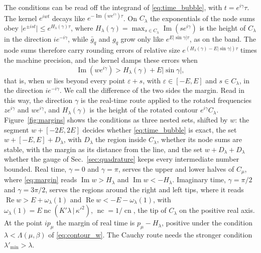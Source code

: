 \documentclass[aps,prb,reprint,a4paper]{revtex4-2}
\newcommand{\cn}{\operatorname{cn}}
\DeclareMathOperator{\Imag}{Im}
\DeclareMathOperator{\Real}{Re}
\begin{document}
The conditions can be read off the integrand of \eqref{eq:time_bubble}, with $t=e^{i\gamma}\tau$. The kernel $e^{iwt}$ decays like $e^{-\Imag(we^{i\gamma})\tau}$. On $C_\lambda$ the exponentials of the node sums obey $\lvert e^{\pm ist}\rvert\le e^{H_\lambda(\gamma)\tau}$, where $H_\lambda(\gamma)=\max_{s\in C_\lambda}\Imag(se^{i\gamma})$ is the height of $C_\lambda$ in the direction $ie^{-i\gamma}$, while $\bar g_q$ and $g_q$ grow only like $e^{E\lvert\sin\gamma\rvert\tau}$, as on the band. The node sums therefore carry rounding errors of relative size $e^{(H_\lambda(\gamma)-E\lvert\sin\gamma\rvert)\tau}$ times the machine precision, and the kernel damps these errors when
\begin{equation}
  \Imag(we^{i\gamma})>H_\lambda(\gamma)+E\lvert\sin\gamma\rvert,
  \label{eq:margin}
\end{equation}
that is, when $w$ lies beyond every point $\varepsilon+s$, with $\varepsilon\in[-E,E]$ and $s\in C_\lambda$, in the direction $ie^{-i\gamma}$. We call the difference of the two sides the margin. Read in this way, the direction $\gamma$ is the real-time route applied to the rotated frequencies $ze^{i\gamma}$ and $we^{i\gamma}$, and $H_\lambda(\gamma)$ is the height of the rotated contour $e^{i\gamma}C_\lambda$. Figure~\ref{fig:margins} shows the conditions as three nested sets, shifted by $w$: the segment $w+[-2E,2E]$ decides whether \eqref{eq:time_bubble} is exact, the set $w+[-E,E]+D_\lambda$, with $D_\lambda$ the region inside $C_\lambda$, whether its node sums are stable, with the margin as its distance from the line, and the set $w+D_\lambda+D_\lambda$ whether the gauge of Sec.~\ref{sec:quadrature} keeps every intermediate number bounded. Real time, $\gamma=0$ and $\gamma=\pi$, serves the upper and lower halves of $C_\mu$, where \eqref{eq:margin} reads $\Imag w>H_\lambda$ and $\Imag w<-H_\lambda$. Imaginary time, $\gamma=\pi/2$ and $\gamma=3\pi/2$, serves the regions around the right and left tips, where it reads $\Real w>E+\omega_\lambda(1)$ and $\Real w<-E-\omega_\lambda(1)$, with $\omega_\lambda(1)=E\operatorname{nc}(K'\lambda\,|\,\kappa'^2)$, $\operatorname{nc}=1/\cn$, the tip of $C_\lambda$ on the positive real axis. At the point $ip_\mu$ the margin of real time is $p_\mu-H_\lambda$, positive under the condition $\lambda<\Lambda(\mu,\beta)$ of \eqref{eq:contour_w}. The Cauchy route needs the stronger condition $\lambda'_{\min}>\lambda$.
\end{document}
